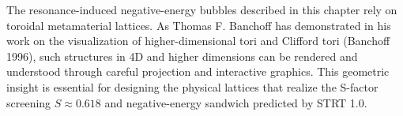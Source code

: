 
The resonance-induced negative-energy bubbles described in this chapter rely on toroidal metamaterial lattices. As Thomas F. Banchoff has demonstrated in his work on the visualization of higher-dimensional tori and Clifford tori (Banchoff 1996), such structures in 4D and higher dimensions can be rendered and understood through careful projection and interactive graphics. This geometric insight is essential for designing the physical lattices that realize the S-factor screening \(S \approx 0.618\) and negative-energy sandwich predicted by STRT 1.0.

